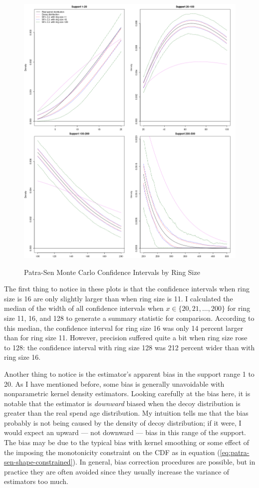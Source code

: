 \documentclass[english]{article}
\begin{document}
\begin{figure}
\caption{Patra-Sen Monte Carlo Confidence Intervals by Ring Size}

\includegraphics[scale=0.5]{images/patra-sen-monte-carlo}\label{figure-patra-sen-monte-carlo-plots}
\end{figure}

The first thing to notice in these plots is that the confidence intervals
when ring size is 16 are only slightly larger than when ring size
is 11. I calculated the median of the width of all confidence intervals
when $x\in\{20,21,\dots,200\}$ for ring size 11, 16, and 128 to generate
a summary statistic for comparison. According to this median, the
confidence interval for ring size 16 was only 14 percent larger than
for ring size 11. However, precision suffered quite a bit when ring
size rose to 128: the confidence interval with ring size 128 was 212
percent wider than with ring size 16.

Another thing to notice is the estimator's apparent bias in the support
range 1 to 20. As I have mentioned before, some bias is generally
unavoidable with nonparametric kernel density estimators. Looking
carefully at the bias here, it is notable that the estimator is \textit{downward}
biased when the decoy distribution is greater than the real spend
age distribution. My intuition tells me that the bias probably is
not being caused by the density of decoy distribution; if it were,
I would expect an upward --- not downward --- bias in this range
of the support. The bias may be due to the typical bias with kernel
smoothing or some effect of the imposing the monotonicity constraint
on the CDF as in equation (\ref{eq:patra-sen-shape-constrained}).
In general, bias correction procedures are possible, but in practice
they are often avoided since they usually increase the variance of
estimators too much.
\end{document}
